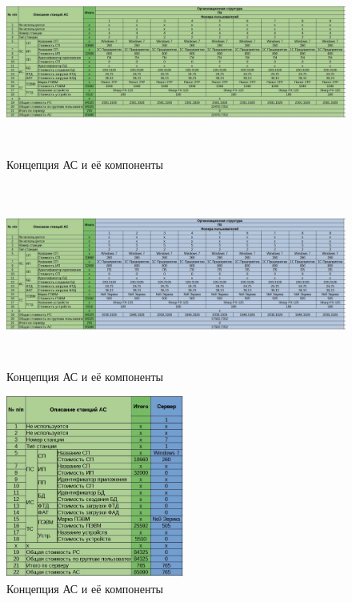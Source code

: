 \documentclass[12pt, a4paper, simple]{eskdtext}
\begin{document}
    \begin{figure}[!hp]
        \centering
        \includegraphics[height=6cm]
            {_docs/Таблица3-1КонцепцияАСИЕеКомпонентыП4.jpg}
        \caption{Концепция АС и её компоненты}
    \end{figure}

    \begin{figure}[!hp]
        \centering
        \includegraphics[height=6cm]
            {_docs/Таблица3-1КонцепцияАСИЕеКомпонентыП5.jpg}
        \caption{Концепция АС и её компоненты}
    \end{figure}

    \begin{figure}[!hp]
        \centering
        \includegraphics[height=6cm]
            {_docs/Таблица3-1КонцепцияАСИЕеКомпонентыСС1.jpg}
        \caption{Концепция АС и её компоненты}
    \end{figure}
    
\end{document}
